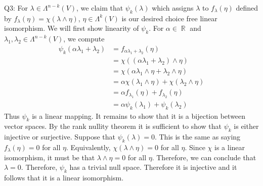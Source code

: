 \documentclass[letterpaper]{article}
\DeclareMathOperator{\R}{\mathbb{R}}
\begin{document}
\noindent Q3: For $\lambda \in \Lambda^{n-k} (V)$, we claim that $\psi_k(\lambda)$ which assigns $\lambda$ to $f_{\lambda}(\eta)$ defined by $f_{\lambda}(\eta)  = \chi(\lambda\wedge \eta)$, $\eta \in \Lambda^{k}(V)$ is our desired choice free linear isomorphism. We will first show linearity of $\psi_k$. For $\alpha\in \R$ and $\lambda_1,\lambda_2\in \Lambda^{n-k}(V)$, we compute 
\begin{align*}
    \psi_{k}(\alpha \lambda_1 + \lambda_2) & =f_{\alpha \lambda_1 + \lambda_2}(\eta )
    \\ & = \chi((\alpha \lambda_1 + \lambda_2) \wedge \eta)
    \\ & = \chi(\alpha\lambda_1 \wedge \eta + \lambda_2 \wedge \eta) \tag{by linearity of $\wedge$}
    \\ & = \alpha \chi(\lambda_1\wedge \eta) + \chi(\lambda_2 \wedge \eta) \tag{by linearity of $\chi$}
    \\ & = \alpha f_{\lambda_1}(\eta) + f_{\lambda_2}(\eta)
    \\ & = \alpha \psi_k (\lambda_1) + \psi_k(\lambda_2)
\end{align*}Thus $\psi_k$ is a linear mapping. It remains to show that it is a bijection between vector spaces. By the rank nullity theorem it is sufficient to show that $\psi_k$ is either injective or surjective. Suppose that $\psi_k(\lambda) = 0$. This is the same as saying $f_{\lambda}(\eta) = 0$ for all $\eta$. Equivalently, $\chi(\lambda \wedge \eta) = 0$ for all $\eta$. Since $\chi$ is a linear isomorphism, it must be that $\lambda \wedge \eta=0$ for all $\eta$. Therefore, we can conclude that $\lambda =0$. Therefore, $\psi_k$ has a trivial null space. Therefore it is injective and it follows that it is a linear isomorphism. 
\end{document}
